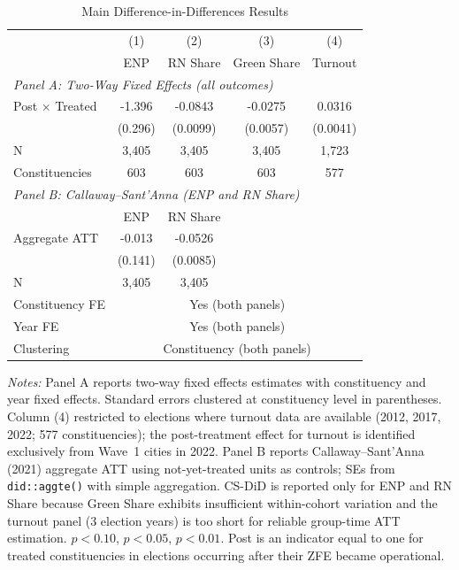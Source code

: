 \begin{table}[H]
\centering
\caption{Main Difference-in-Differences Results}
\label{tab:main_did}
\begin{threeparttable}
\begin{tabular}{lcccc}
\toprule
 & (1) & (2) & (3) & (4) \\
 & ENP & RN Share & Green Share & Turnout \\
\midrule
\multicolumn{5}{l}{\textit{Panel A: Two-Way Fixed Effects (all outcomes)}} \\[3pt]
Post $\times$ Treated & -1.396\sym{***} & -0.0843\sym{***} & -0.0275\sym{***} & 0.0316\sym{***} \\
 & (0.296) & (0.0099) & (0.0057) & (0.0041) \\
N & 3,405 & 3,405 & 3,405 & 1,723 \\
Constituencies & 603 & 603 & 603 & 577 \\[6pt]
\multicolumn{5}{l}{\textit{Panel B: Callaway--Sant'Anna (ENP and RN Share)}} \\[3pt]
 & ENP & RN Share & & \\
Aggregate ATT & -0.013 & -0.0526\sym{***} & & \\
 & (0.141) & (0.0085) & & \\
N & 3,405 & 3,405 & & \\[3pt]
\midrule
Constituency FE & \multicolumn{4}{c}{Yes (both panels)} \\
Year FE & \multicolumn{4}{c}{Yes (both panels)} \\
Clustering & \multicolumn{4}{c}{Constituency (both panels)} \\
\bottomrule
\end{tabular}
\begin{tablenotes}[flushleft]
\small
\item \textit{Notes:} Panel A reports two-way fixed effects estimates with constituency and year fixed effects. Standard errors clustered at constituency level in parentheses. Column (4) restricted to elections where turnout data are available (2012, 2017, 2022; 577 constituencies); the post-treatment effect for turnout is identified exclusively from Wave~1 cities in 2022. Panel B reports Callaway--Sant'Anna (2021) aggregate ATT using not-yet-treated units as controls; SEs from \texttt{did::aggte()} with simple aggregation. CS-DiD is reported only for ENP and RN Share because Green Share exhibits insufficient within-cohort variation and the turnout panel (3 election years) is too short for reliable group-time ATT estimation. \sym{*} $p<0.10$, \sym{**} $p<0.05$, \sym{***} $p<0.01$. Post is an indicator equal to one for treated constituencies in elections occurring after their ZFE became operational.
\end{tablenotes}
\end{threeparttable}
\end{table}
